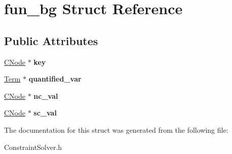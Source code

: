 \hypertarget{structfun__bg}{\section{fun\-\_\-bg \-Struct \-Reference}
\label{structfun__bg}
}
\subsection*{\-Public \-Attributes}
\begin{DoxyCompactItemize}
\item 
\hypertarget{structfun__bg_ac08c75138f8571270e66c540873e3d5f}{\hyperlink{classCNode}{\-C\-Node} $\ast$ {\bfseries key}}\label{structfun__bg_ac08c75138f8571270e66c540873e3d5f}

\item 
\hypertarget{structfun__bg_a9e605822bd2112167a13fff953bb419c}{\hyperlink{classTerm}{\-Term} $\ast$ {\bfseries quantified\-\_\-var}}\label{structfun__bg_a9e605822bd2112167a13fff953bb419c}

\item 
\hypertarget{structfun__bg_a11758482a6c506138dfbebc9486a6eba}{\hyperlink{classCNode}{\-C\-Node} $\ast$ {\bfseries nc\-\_\-val}}\label{structfun__bg_a11758482a6c506138dfbebc9486a6eba}

\item 
\hypertarget{structfun__bg_a39d796262955c81e89ac9e51c03736e8}{\hyperlink{classCNode}{\-C\-Node} $\ast$ {\bfseries sc\-\_\-val}}\label{structfun__bg_a39d796262955c81e89ac9e51c03736e8}

\end{DoxyCompactItemize}


\-The documentation for this struct was generated from the following file\-:\begin{DoxyCompactItemize}
\item 
\-Constraint\-Solver.\-h\end{DoxyCompactItemize}
